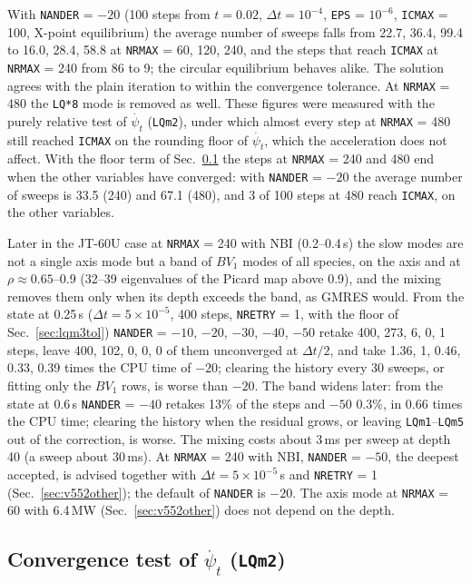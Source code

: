 \documentclass[11pt]{article}
\def\psit{\psi_t}
\def\psitd{\dot{\psit}}
\begin{document}
With \texttt{NANDER} = $-20$ (100 steps from $t = 0.02$, $\Delta t = 10^{-4}$,
\texttt{EPS} = $10^{-6}$, \texttt{ICMAX} = 100, X-point equilibrium) the average
number of sweeps falls from 22.7, 36.4, 99.4 to 16.0, 28.4, 58.8 at \texttt{NRMAX} =
60, 120, 240, and the steps that reach \texttt{ICMAX} at \texttt{NRMAX} = 240 from 86 to 9;
the circular equilibrium behaves alike.  The solution agrees with the plain
iteration to within the convergence tolerance.  At \texttt{NRMAX} = 480 the
\texttt{LQ*8} mode is removed as well.  These figures were measured with the
purely relative test of $\psitd$ (\texttt{LQm2}), under which almost every step at
\texttt{NRMAX} = 480 still reached \texttt{ICMAX} on the rounding floor of $\psitd$,
which the acceleration does not affect.  With the floor term of
Sec.~\ref{sec:lqm2tol} the steps at \texttt{NRMAX} = 240 and 480 end when the
other variables have converged: with \texttt{NANDER} = $-20$ the average number
of sweeps is 33.5 (240) and 67.1 (480), and 3 of 100 steps at 480 reach
\texttt{ICMAX}, on the other variables.

Later in the JT-60U case at \texttt{NRMAX} = 240 with NBI (0.2--0.4\,s) the slow
modes are not a single axis mode but a band of $BV_1$ modes of all species, on the
axis and at $\rho\approx0.65$--0.9 (32--39 eigenvalues of the Picard map above 0.9),
and the mixing removes them only when its depth exceeds the band, as GMRES would.
From the state at 0.25\,s ($\Delta t = 5\times10^{-5}$, 400 steps, \texttt{NRETRY} = 1,
with the floor of Sec.~\ref{sec:lqm3tol}) \texttt{NANDER} = $-10$, $-20$, $-30$, $-40$,
$-50$ retake 400, 273, 6, 0, 1 steps, leave 400, 102, 0, 0, 0 of them unconverged at
$\Delta t/2$, and take 1.36, 1, 0.46, 0.33, 0.39 times the CPU time of $-20$;
clearing the history every 30 sweeps, or fitting only the $BV_1$ rows, is worse than
$-20$.  The band widens later: from the state at 0.6\,s \texttt{NANDER} = $-40$ retakes
13\% of the steps and $-50$ 0.3\%, in 0.66 times the CPU time; clearing the history when
the residual grows, or leaving \texttt{LQm1}--\texttt{LQm5} out of the correction, is
worse.  The mixing costs about 3\,ms per sweep at depth 40 (a sweep about 30\,ms).
At \texttt{NRMAX} = 240 with NBI, \texttt{NANDER} = $-50$, the deepest accepted, is advised
together with $\Delta t = 5\times10^{-5}$\,s and \texttt{NRETRY} = 1 (Sec.~\ref{sec:v552other});
the default of \texttt{NANDER} is $-20$.
The axis mode at \texttt{NRMAX} = 60 with 6.4\,MW (Sec.~\ref{sec:v552other}) does not
depend on the depth.

\subsection{Convergence test of $\psitd$ (\texttt{LQm2})}
\label{sec:lqm2tol}
\end{document}
